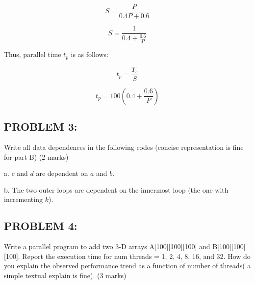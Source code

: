 \documentclass[12pt,letterpaper]{article}
\begin{document}
\[ S = \frac{P}{0.4P + 0.6} \]

\[ S = \frac{1}{ 0.4 + \frac{0.6}{P}} \]

Thus, parallel time \(t_p\) is as follows:

\[ t_p = \frac{T_s}{S} \]

\[ t_p = 100(0.4 + \frac{0.6}{P}) \]

\pagebreak


\subsection*{PROBLEM 3:}
Write all data dependences in the following codes (concise representation is fine for 
part B) (2 marks)

\hline

a. \(c\) and \(d\) are dependent on \(a\) and \(b\).

b. The two outer loops are dependent on the innermost loop (the one with incrementing \(k\)).


\subsection*{PROBLEM 4:}
Write a parallel program to add two 3-D arrays A[100][100][100] and B[100][100][100]. 
Report the execution time for num threads = 1, 2, 4, 8, 16, and 32. How do you explain 
the observed performance trend as a function of number of threads( a simple textual 
explain is fine). (3 marks)

\hline
\end{document}
